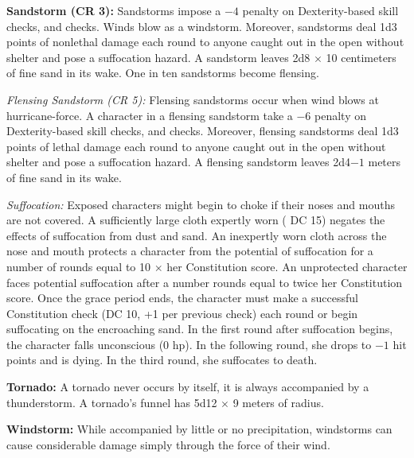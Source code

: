 
\textbf{Sandstorm (CR 3):} Sandstorms impose a $-4$ penalty on Dexterity-based skill checks, and  checks. Winds blow as a windstorm. Moreover, sandstorms deal 1d3 points of nonlethal damage each round to anyone caught out in the open without shelter and pose a suffocation hazard. A sandstorm leaves 2d8 $\times$ 10 centimeters of fine sand in its wake. One in ten sandstorms become flensing.

\textit{Flensing Sandstorm (CR 5):} Flensing sandstorms occur when wind blows at hurricane-force. A character in a flensing sandstorm take a $-6$ penalty on Dexterity-based skill checks, and  checks. Moreover, flensing sandstorms deal 1d3 points of lethal damage each round to anyone caught out in the open without shelter and pose a suffocation hazard. A flensing sandstorm leaves 2d4$-1$ meters of fine sand in its wake.

\textit{Suffocation:} Exposed characters might begin to choke if their noses and mouths are not covered. A sufficiently large cloth expertly worn ( DC 15) negates the effects of suffocation from dust and sand. An inexpertly worn cloth across the nose and mouth protects a character from the potential of suffocation for a number of rounds equal to 10 $\times$ her Constitution score. An unprotected character faces potential suffocation after a number rounds equal to twice her Constitution score. Once the grace period ends, the character must make a successful Constitution check (DC 10, +1 per previous check) each round or begin suffocating on the encroaching sand. In the first round after suffocation begins, the character falls unconscious (0 hp). In the following round, she drops to $-1$ hit points and is dying. In the third round, she suffocates to death.

\textbf{Tornado:} A tornado never occurs by itself, it is always accompanied by a thunderstorm. A tornado's funnel has 5d12 $\times$ 9 meters of radius.

\textbf{Windstorm:} While accompanied by little or no precipitation, windstorms can cause considerable damage simply through the force of their wind.

